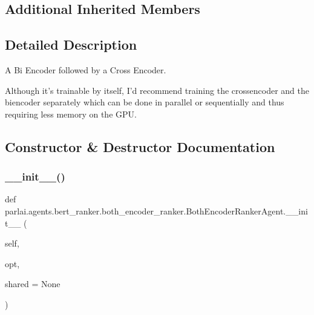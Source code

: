 \subsection*{Additional Inherited Members}


\subsection{Detailed Description}
\begin{DoxyVerb}A Bi Encoder followed by a Cross Encoder.

Although it's trainable by itself, I'd recommend training the crossencoder and the
biencoder separately which can be done in parallel or sequentially and thus
requiring less memory on the GPU.
\end{DoxyVerb}
 

\subsection{Constructor \& Destructor Documentation}
\mbox{\label{classparlai_1_1agents_1_1bert__ranker_1_1both__encoder__ranker_1_1BothEncoderRankerAgent_a96d864d610277625195f71a615c0f585}} 
\subsubsection{\texorpdfstring{\+\_\+\+\_\+init\+\_\+\+\_\+()}{\_\_init\_\_()}}
{\footnotesize\ttfamily def parlai.\+agents.\+bert\+\_\+ranker.\+both\+\_\+encoder\+\_\+ranker.\+Both\+Encoder\+Ranker\+Agent.\+\_\+\+\_\+init\+\_\+\+\_\+ (\begin{DoxyParamCaption}\item[{}]{self,  }\item[{}]{opt,  }\item[{}]{shared = {\ttfamily None} }\end{DoxyParamCaption})}



